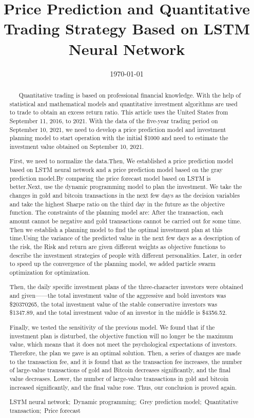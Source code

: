 \documentclass{mcmthesis}
\title{Price Prediction and Quantitative Trading Strategy Based on LSTM Neural Network}  %
\date{\today}
\begin{document}
	\begin{abstract}
		\ \ \ Quantitative trading is based on professional financial knowledge. With the help of statistical and mathematical models and quantitative investment algorithms are used to trade to obtain an excess return ratio. This article uses the United States from September 11, 2016, to 2021. With the data of the five-year trading period on September 10, 2021, we need to develop a price prediction model and investment planning model to start operation with the initial \$1000 and need to estimate the investment value obtained on September 10, 2021. 
		
		First, we need to normalize the data.Then, We established a price prediction model based on LSTM neural network and a price prediction model based on the gray prediction model.By comparing the price forecast model based on LSTM is better.Next, use the dynamic programming model to plan the investment. We take the changes in gold and bitcoin transactions in the next few days as the decision variables and take the highest Sharpe ratio on the third day in the future as the objective function. The constraints of the planning model are: After the transaction, each amount cannot be negative and gold transactions cannot be carried out for some time. Then we establish a planning model to find the optimal investment plan at this time.Using the variance of the predicted value in the next few days as a description of the risk, the Risk and return are given different weights as objective functions to describe the investment strategies of people with different personalities. Later, in order to speed up the convergence of the planning model, we added particle swarm optimization for optimization.
		
		Then, the daily specific investment plans of the three-character investors were obtained and given——the total investment value of the aggressive and bold investors was \$20370265, the total investment value of the stable conservative investors was \$1347.89, and the total investment value of an investor in the middle is \$4356.52.
		
		Finally, we tested the sensitivity of the previous model. We found that if the investment plan is disturbed, the objective function will no longer be the maximum value, which means that it does not meet the psychological expectations of investors. Therefore, the plan we gave is an optimal solution. Then, a series of changes are made to the transaction fee, and it is found that as the transaction fee increases, the number of large-value transactions of gold and Bitcoin decreases significantly, and the final value decreases. Lower, the number of large-value transactions in gold and bitcoin increased significantly, and the final value rose. Thus, our conclusion is proved again.
		
		
		
		\begin{keywords}  
			LSTM neural network;\  Dynamic programming;\ Grey prediction model;\ Quantitative transaction;\ Price forecast
		\end{keywords}
	\end{abstract}
	
\end{document}
